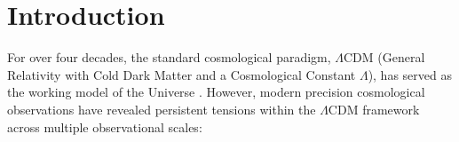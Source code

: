 \documentclass[aps,prd,reprint,superscriptaddress,nofootinbib,floatfix,amsmath,amssymb]{revtex4-2}
\begin{document}
\begin{abstract}
($k_{\text{internal}} = 0$), tying all galactic and cosmological predictions directly to the single measurable physical horizon scale of our universe ($R_0 \equiv c/H_0$).
\end{abstract}


\maketitle

\section{Introduction}
\label{sec:intro}

For over four decades, the standard cosmological paradigm, $\Lambda\text{CDM}$ (General Relativity with Cold Dark Matter and a Cosmological Constant $\Lambda$), has served as the working model of the Universe \cite{Planck2018_Cosmology}. However, modern precision cosmological observations have revealed persistent tensions within the $\Lambda\text{CDM}$ framework across multiple observational scales:
\end{document}
